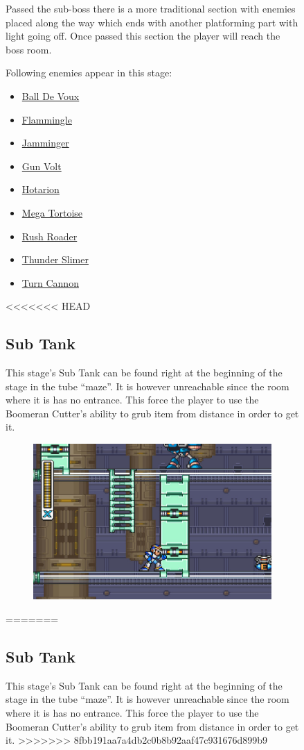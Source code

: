 \begin{figure}[htp]
Passed the sub-boss there is a more traditional section with enemies placed along the way which ends with another platforming part with light going off. Once passed this section the player will reach the boss room.

Following enemies appear in this stage\cite{wiki:Power_plant}:
\begin{itemize}
	\item \hyperlink{enem:Ball_De_Voux}{Ball De Voux}
	\item \hyperlink{enem:Flammingle}{Flammingle}
	\item \hyperlink{enem:Jamminger}{Jamminger}
	\item \hyperlink{enem:Gun_Volt}{Gun Volt}
	\item \hyperlink{enem:Hotarion}{Hotarion}
	\item \hyperlink{enem:Mega_Tortoise}{Mega Tortoise}
	\item \hyperlink{enem:Rush_Roader}{Rush Roader}
	\item \hyperlink{miniboss:Thunder_Slimer}{Thunder Slimer}
	\item \hyperlink{enem:Turn_Cannon}{Turn Cannon}
\end{itemize}

<<<<<<< HEAD
\subsection{Sub Tank}
This stage's Sub Tank can be found right at the beginning of the stage in the tube ``maze''. It is however unreachable since the room where it is has no entrance. This force the player to use the Boomeran Cutter's ability to grub item from distance in order to get it.
\begin{figure}[htp]
	\centering
	\includegraphics[width=0.45\linewidth]{figures/X1/Spark_mandrill/Mandrill_tank.jpg}
\end{figure}
=======

 


\subsection{Sub Tank}
This stage's Sub Tank can be found right at the beginning of the stage in the tube ``maze''. It is however unreachable since the room where it is has no entrance. This force the player to use the Boomeran Cutter's ability to grub item from distance in order to get it.
>>>>>>> 8fbb191aa7a4db2c0b8b92aaf47c931676d899b9


\end{figure}
